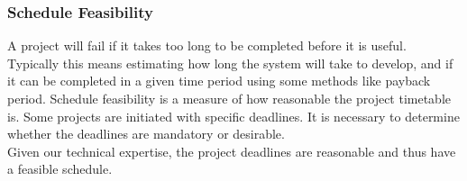 \subsubsection{Schedule Feasibility}
A project will fail if it takes too long to be completed before it is useful. Typically this means estimating how long the system will take to develop, and if it can be completed in a given time period using some methods like payback period. Schedule feasibility is a measure of how reasonable the project timetable is. Some projects are initiated with specific deadlines. It is necessary to determine whether the deadlines are mandatory or desirable.\\
Given our technical expertise, the project deadlines are reasonable and thus have a feasible schedule.

